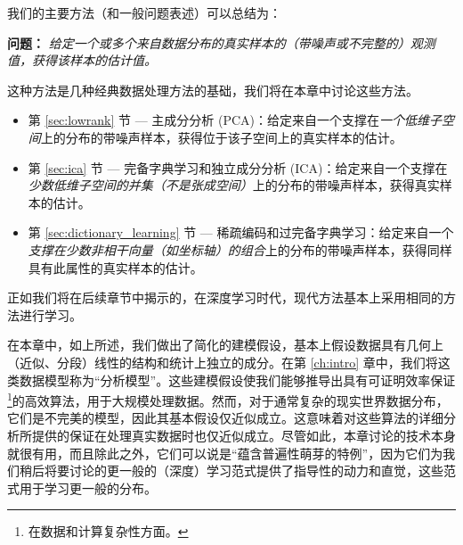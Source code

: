 \documentclass[../../book-main_zh.tex]{subfiles}
\begin{document}
我们的主要方法（和一般问题表述）可以总结为：
\begin{tcolorbox}\centering
    \textbf{问题：} \textit{给定一个或多个来自数据分布的真实样本的（带噪声或不完整的）观测值，获得该样本的估计值。}
\end{tcolorbox}
这种方法是几种经典数据处理方法的基础，我们将在本章中讨论这些方法。
\begin{itemize}
    \item 第 \ref{sec:lowrank} 节 --- 主成分分析 (PCA)：给定来自一个支撑在\textit{一个低维子空间}上的分布的带噪声样本，获得位于该子空间上的真实样本的估计。
    \item 第 \ref{sec:ica} 节 --- 完备字典学习和独立成分分析 (ICA)：给定来自一个支撑在\textit{少数低维子空间的并集（\textit{不是}张成空间）}上的分布的带噪声样本，获得真实样本的估计。
    \item 第 \ref{sec:dictionary_learning} 节 --- 稀疏编码和过完备字典学习：给定来自一个\textit{支撑在少数非相干向量（如坐标轴）的组合}上的分布的带噪声样本，获得同样具有此属性的真实样本的估计。
\end{itemize}
正如我们将在后续章节中揭示的，在深度学习时代，现代方法基本上采用相同的方法进行学习。

在本章中，如上所述，我们做出了简化的建模假设，基本上假设数据具有几何上（近似、分段）线性的结构和统计上独立的成分。在第 \ref{ch:intro} 章中，我们将这类数据模型称为“分析模型”。这些建模假设使我们能够推导出具有可证明效率保证\footnote{在数据和计算复杂性方面。}的高效算法，用于大规模处理数据。然而，对于通常复杂的现实世界数据分布，它们是不完美的模型，因此其基本假设仅近似成立。这意味着对这些算法的详细分析所提供的保证在处理真实数据时也仅近似成立。尽管如此，本章讨论的技术本身就很有用，而且除此之外，它们可以说是“蕴含普遍性萌芽的特例”，因为它们为我们稍后将要讨论的更一般的（深度）学习范式提供了指导性的动力和直觉，这些范式用于学习更一般的分布。%


\end{document}
